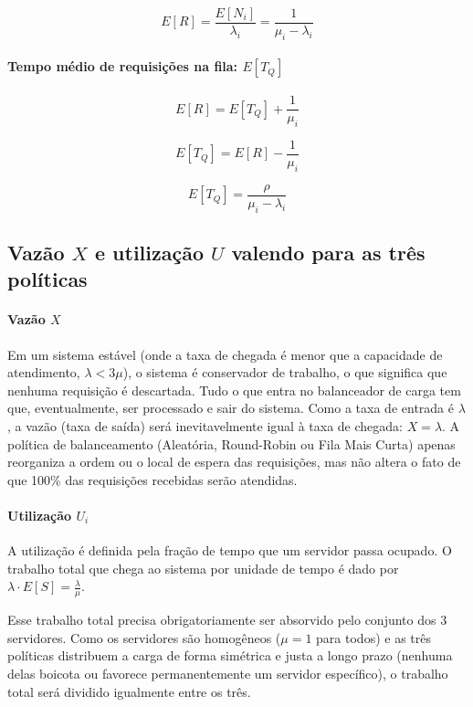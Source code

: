 \documentclass[conference]{IEEE_Conference_Template/IEEEtran}
\begin{document}
\begin{equation}
E[R] = \frac{E[N_i]}{\lambda_i} = \frac{1}{\mu_i - \lambda_i}
\end{equation}

\paragraph{Tempo médio de requisições na fila: $E[T_Q]$}
\begin{equation}
E[R] = E[T_Q] + \frac{1}{\mu_i}
\end{equation}

\begin{equation}
E[T_Q] = E[R] - \frac{1}{\mu_i}
\end{equation}

\begin{equation}
E[T_Q] = \frac{\rho}{\mu_i - \lambda_i}
\end{equation}

\subsection{Vazão $X$ e utilização $U$ valendo para as três políticas}

\paragraph{Vazão $X$}
Em um sistema estável (onde a taxa de chegada é menor que a capacidade de atendimento, $\lambda < 3\mu$), o sistema é conservador de trabalho, o que significa que nenhuma requisição é descartada. Tudo o que entra no balanceador de carga tem que, eventualmente, ser processado e sair do sistema. Como a taxa de entrada é $\lambda$, a vazão (taxa de saída) será inevitavelmente igual à taxa de chegada: $X = \lambda$. A política de balanceamento (Aleatória, Round-Robin ou Fila Mais Curta) apenas reorganiza a ordem ou o local de espera das requisições, mas não altera o fato de que 100\% das requisições recebidas serão atendidas.

\paragraph{Utilização $U_i$}
A utilização é definida pela fração de tempo que um servidor passa ocupado. O trabalho total que chega ao sistema por unidade de tempo é dado por $\lambda \cdot E[S] = \frac{\lambda}{\mu}$.

Esse trabalho total precisa obrigatoriamente ser absorvido pelo conjunto dos 3 servidores. Como os servidores são homogêneos ($\mu = 1$ para todos) e as três políticas distribuem a carga de forma simétrica e justa a longo prazo (nenhuma delas boicota ou favorece permanentemente um servidor específico), o trabalho total será dividido igualmente entre os três.
\end{document}
